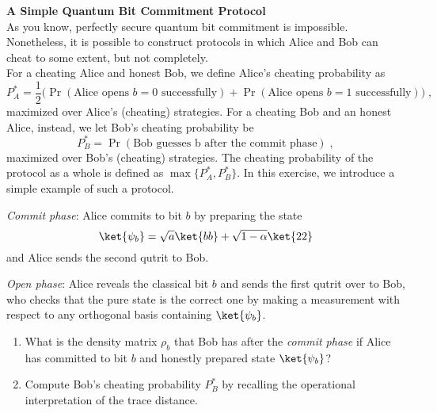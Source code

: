 \begin{exercises}
\item {\bf A Simple Quantum Bit Commitment Protocol}\\
As you know, perfectly secure quantum bit commitment is impossible. Nonetheless, it is possible to construct protocols in which Alice and Bob can cheat to some extent, but not completely. \\
For a cheating Alice and honest Bob, we define Alice's cheating probability as \[ P_A^*= \frac{1}{2}\big(\Pr(\mbox{Alice opens $b=0$ successfully})+\Pr(\mbox{Alice opens $b=1$ successfully})\big)\;,\]
 maximized over Alice's (cheating) strategies. For a cheating Bob and an honest Alice, instead, we let Bob's cheating probability be $$P_B^* = \Pr(\mbox{Bob guesses b after the commit phase})\;,$$ maximized over Bob's (cheating) strategies. The cheating probability of the protocol as a whole is defined as $\max \{P_A^*,P_B^*\}$. In this exercise, we introduce a simple example of such a protocol.
\begin{protocolEnumerate}
\item \textit{Commit phase}: Alice commits to bit $b$ by preparing the state
$$\ket{\psi_b} = \sqrt{a} \ket{bb} + \sqrt{1-\alpha}\ket{22}$$ and Alice sends the second qutrit to Bob.
\item \textit{Open phase}: Alice reveals the classical bit $b$ and sends the first qutrit over to Bob, who checks that the pure state is the correct one by making a measurement with respect to any orthogonal basis containing $\ket{\psi_b}$.
\end{protocolEnumerate}
\begin{enumerate}
\item What is the density matrix $\rho_b$ that Bob has after the \textit{commit phase} if Alice has committed to bit $b$ and honestly prepared state $\ket{\psi_b}$?
\item Compute Bob's cheating probability $P_B^*$ by recalling the operational interpretation of the trace distance.

\end{enumerate}
\end{exercises}
